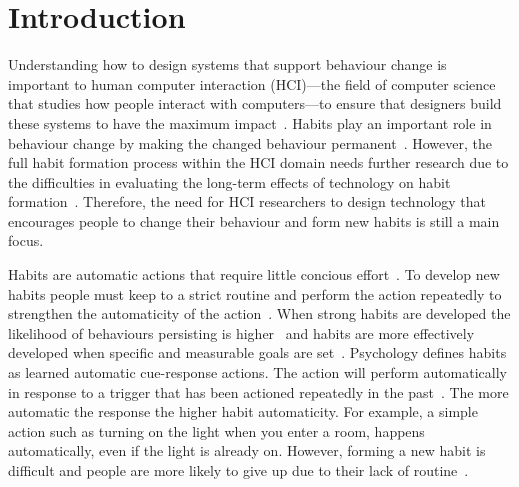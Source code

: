 
\section{Introduction}
Understanding how to design systems that support behaviour change is important to human computer interaction (HCI)---the field of computer science that studies how people interact with computers---to ensure that designers build these systems to have the maximum impact~\cite{article_evaluate_tech_health_behaviour_change}. Habits play an important role in behaviour change by making the changed behaviour permanent~\cite{article_promoting_habit_formation}. However, the full habit formation process within the HCI domain needs further research due to the difficulties in evaluating the long-term effects of technology on habit formation~\cite{article_evaluate_tech_health_behaviour_change}. Therefore, the need for HCI researchers to design technology that encourages people to change their behaviour and form new habits is still a main focus.

Habits are automatic actions that require little concious effort~\cite{article_the_habitual_consumer}. To develop new habits people must keep to a strict routine and perform the action repeatedly to strengthen the automaticity of the action~\cite{article_promoting_habit_formation}. When strong habits are developed the likelihood of behaviours persisting is higher~\cite{putting_habit_into_practice} and habits are more effectively developed when specific and measurable goals are set~\cite{habits_better_when_have_specific_and_measurable_goals}. Psychology defines habits as learned automatic cue-response actions. The action will perform automatically in response to a trigger that has been actioned repeatedly in the past~\cite{article_the_habitual_consumer}. The more automatic the response the higher habit automaticity. For example, a simple action such as turning on the light when you enter a room, happens automatically, even if the light is already on. However, forming a new habit is difficult and people are more likely to give up due to their lack of routine~\cite{article_promoting_habit_formation, article_the_habitual_consumer}.

